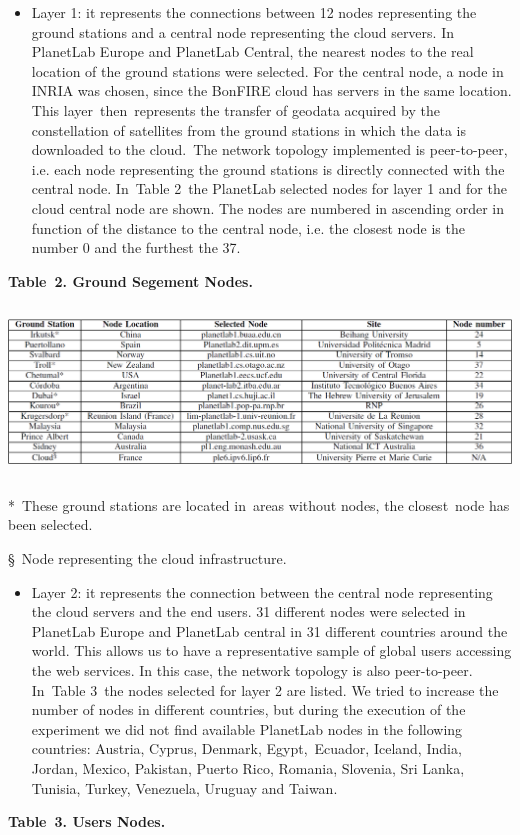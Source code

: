 \documentclass[a4paper]{article}
\newcommand\liststyleLFOiv{%
\renewcommand\labelitemi{[F0B7?]}
\renewcommand\labelitemii{o}
\renewcommand\labelitemiii{[F0A7?]}
\renewcommand\labelitemiv{[F0B7?]}
}
\begin{document}
\liststyleLFOiv
\begin{itemize}
\item Layer 1: it represents the connections between 12 nodes
representing the ground stations and a central node representing the
cloud servers. In PlanetLab Europe and PlanetLab Central, the nearest
nodes to the real location of the ground stations were selected. For
the central node, a node in INRIA was chosen, since the BonFIRE cloud
has servers in the same location. This layer\ then\ represents the
transfer of geodata acquired by the constellation of satellites from
the ground stations in which the data is downloaded to the cloud.\ The
network topology implemented is peer-to-peer, i.e. each node
representing the ground stations is directly connected with the central
node. In\ Table 2\ the PlanetLab selected nodes for layer 1 and for the
cloud central node are shown. The nodes are numbered in ascending order
in function of the distance to the central node, i.e. the closest node
is the number 0 and the furthest the 37.\ 
\end{itemize}
{\centering\bfseries
\label{bkm:Ref387229383}Table\ 2. Ground Segement Nodes.
\par}

{\centering 
\includegraphics[width=6.20079in,height=1.79134in]{ple-img7.png} \par}

*\ These ground stations are located in\ areas without nodes, the
closest\ node has been selected.

{\S}\ Node representing the cloud infrastructure.

\liststyleLFOiv
\begin{itemize}
\item Layer 2: it represents the connection between the central node
representing the cloud servers and the end users. 31 different nodes
were selected in PlanetLab Europe and PlanetLab central in 31 different
countries around the world. This allows us to have a representative
sample of global users accessing the web services. In this case, the
network topology is also peer-to-peer. In\ Table 3\ the nodes selected
for layer 2 are listed. We tried to increase the number of nodes in
different countries, but during the execution of the experiment we did
not find available PlanetLab nodes in the following countries: Austria,
Cyprus, Denmark, Egypt,\ Ecuador, Iceland, India, Jordan, Mexico,
Pakistan, Puerto Rico, Romania, Slovenia, Sri Lanka, Tunisia, Turkey,
Venezuela, Uruguay and Taiwan.\ 
\end{itemize}
{\centering\bfseries
\label{bkm:Ref387229503}Table\ 3. Users Nodes.
\par}
\end{document}
